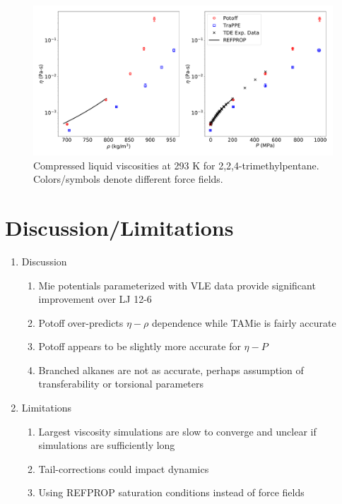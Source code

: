 \documentclass[preprint,review,12pt]{elsarticle}
\begin{document}
	\begin{figure}[htb!]
		\centering
		\includegraphics[width=6.4in]{compare_REFPROP_T293highP_IC8H18_without_devPlots.pdf}
		\caption{Compressed liquid viscosities at 293 K for 2,2,4-trimethylpentane. Colors/symbols denote different force fields.}
		\label{fig:T293highP_IC8}
	\end{figure} 
	
	\section{Discussion/Limitations} \label{Discussion/Limitations}
	
	\begin{enumerate}
		\item Discussion
		\begin{enumerate}
			\item Mie potentials parameterized with VLE data provide significant improvement over LJ 12-6
			\item Potoff over-predicts $\eta-\rho$ dependence while TAMie is fairly accurate
			\item Potoff appears to be slightly more accurate for $\eta-P$
			\item Branched alkanes are not as accurate, perhaps assumption of transferability or torsional parameters
		\end{enumerate}
		\item Limitations
		\begin{enumerate}
			\item Largest viscosity simulations are slow to converge and unclear if simulations are sufficiently long
			\item Tail-corrections could impact dynamics
			\item Using REFPROP saturation conditions instead of force fields
		\end{enumerate}
	\end{enumerate}
	
\end{document}
